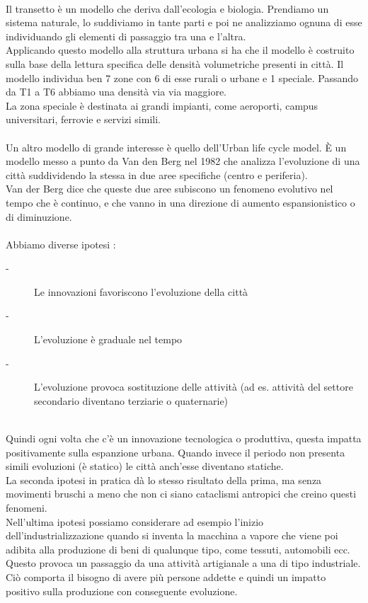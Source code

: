 \documentclass[a4paper,12pt, oneside]{book}
\begin{document}
  \leavevmode\\ 
  Il transetto è un modello che deriva dall'ecologia e biologia. Prendiamo un sistema naturale, lo suddiviamo in tante parti e poi ne analizziamo ognuna di esse individuando gli elementi di passaggio tra una e l'altra.\\
  Applicando questo modello alla struttura urbana si ha che il modello è costruito sulla base della lettura specifica delle densità volumetriche presenti in città. Il modello individua ben 7 zone con 6 di esse rurali o urbane e 1 speciale. Passando da T1 a T6 abbiamo una densità via via maggiore.\\
  La zona speciale è destinata ai grandi impianti, come aeroporti, campus universitari, ferrovie e servizi simili.\\ \\
  Un altro modello di grande interesse è quello dell'Urban life cycle model. È un modello messo a punto da Van den Berg nel 1982 che analizza l'evoluzione di una città suddividendo la stessa in due aree specifiche (centro e periferia).\\
  Van der Berg dice che queste due aree subiscono un fenomeno evolutivo nel tempo che è continuo, e che vanno in una direzione di aumento espansionistico o di diminuzione.\\ \\
  Abbiamo diverse ipotesi :
  \begin{description}
  	\item [-] Le innovazioni favoriscono l'evoluzione della città
  	\item [-] L'evoluzione è graduale nel tempo
  	\item [-] L'evoluzione provoca sostituzione delle attività (ad es. attività del settore secondario diventano terziarie o quaternarie)
  \end{description}
  \leavevmode\\ 
  Quindi ogni volta che c'è un innovazione tecnologica o produttiva, questa impatta positivamente sulla espanzione urbana. Quando invece il periodo non presenta simili evoluzioni (è statico) le città anch'esse diventano statiche.\\
  La seconda ipotesi in pratica dà lo stesso risultato della prima, ma senza movimenti bruschi a meno che non ci siano cataclismi antropici che creino questi fenomeni.\\
  Nell'ultima ipotesi possiamo considerare ad esempio l'inizio dell'industrializzazione quando si inventa la macchina a vapore che viene poi adibita alla produzione di beni di qualunque tipo, come tessuti, automobili ecc. Questo provoca un passaggio da una attività artigianale a una di tipo industriale. Ciò comporta il bisogno di avere più persone addette e quindi un impatto positivo sulla produzione con conseguente evoluzione.\\
\end{document}
